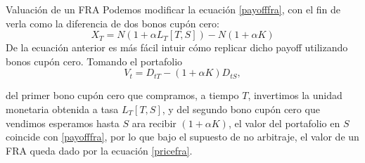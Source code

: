 \documentclass[11pt]{beamer}
\begin{document}
\begin{frame}{Valuación de un FRA}
	Podemos modificar la ecuación \eqref{payofffra}, con el fin de verla como la diferencia de dos bonos cupón cero:
	\begin{equation}\label{pricefra}
	X_T=N(1+\alpha L_T[T,S])-N(1+\alpha K)
	\end{equation}
	De la ecuación anterior es más fácil intuir cómo replicar dicho payoff utilizando bonos cupón cero.\medskip
	Tomando el portafolio
	\begin{equation}
	V_t=D_{tT}-(1+\alpha K)D_{tS},
	\end{equation}
	
	del primer bono cupón cero que compramos, a tiempo $T$, invertimos la unidad monetaria obtenida a tasa $L_T[T,S]$, y del segundo bono  cupón cero que vendimos esperamos hasta $S$ ara recibir $(1+\alpha K)$, el valor del portafolio en $S$ coincide con \eqref{payofffra}, por lo que bajo el supuesto de no arbitraje, el valor de un FRA queda dado por la ecuación \eqref{pricefra}.
	
\end{frame}
\end{document}
